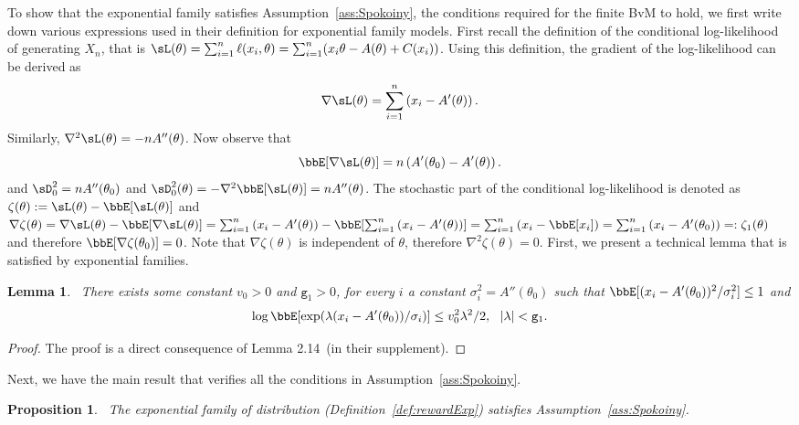 \documentclass[11pt]{article}
\newtheorem{lemma}[theorem]{Lemma}
\newtheorem{proposition}[theorem]{Proposition}
\begin{document}
To show that the exponential family satisfies Assumption~\ref{ass:Spokoiny}, the conditions required for the finite BvM to hold, we first write down various expressions used in their definition for exponential family models.
First recall the definition of the conditional log-likelihood of generating $X_n$, that is $\sL(\theta) = \sum_{i=1}^{n} \ell(x_i,\theta)= \sum_{i=1}^{n} (x_i\theta-A(\theta)+C(x_i))$.
Using this definition, the gradient of the log-likelihood can be derived as
\begin{align}
    \nabla \sL(\theta) = \sum_{i=1}^{n} \left({x_i    -  A'(  \theta) }\right).
\end{align}
Similarly, $\nabla^2 \sL(\theta) = -n A''(  \theta)$. Now observe that \[\bbE[\nabla \sL(\theta)] =  n\left(A'(  \theta_0)-A'(  \theta)\right).\]
and $\sD_0^{2}= n A''(\theta_0)$ and $\sD_0^{2}(\theta)
     = 
    - \nabla^{2} \bbE[ \sL(\theta)]  = n A''(\theta) $.
The stochastic part of the conditional log-likelihood is denoted as $\zeta (\theta):= \sL(\theta) - \bbE[\sL(\theta)]$ and $\nabla \zeta (\theta) = \nabla \sL(\theta) - \bbE[\nabla \sL(\theta)]= \sum_{i=1}^{n} \left({x_i    -  A'(\theta) }\right) - \bbE[ \sum_{i=1}^{n} \left({x_i    -  A'(  \theta) }\right)] = \sum_{i=1}^{n} \left(x_i  - \bbE[x_i]\right) = \sum_{i=1}^{n} \left(x_i  - A'(\theta_0)\right)=: \zeta_1 (\theta)$ and therefore $\bbE[\nabla \zeta(\theta_0)]=0$. Note that $\nabla \zeta(\theta)$ is independent of $\theta$, therefore $\nabla^2 \zeta(\theta)=0$. %
First, we present a technical lemma that is satisfied by exponential families.
\begin{lemma}~\label{lem:Aux1}
        There exists some constant $v_0>0$ and $\mathtt{g}_1>0$, for every $i$ a constant  $\sigma_i^2=A''( \theta_0)$  such that $\bbE[(x_i - A'(\theta_0))^2/\sigma_i^2]\leq 1$ and 
        \begin{align}
            \log \bbE [ \exp(\lambda (x_i - A'(\theta_0))/\sigma_i) ] \leq v_0^2 \lambda^2/2 , ~~|\lambda| < \mathtt{g}_1.
        \end{align}
    \end{lemma}
    \begin{proof}
        The proof is a direct consequence of Lemma 2.14~\cite{Spokoiny2012}(in their supplement).
    \end{proof}
Next, we have the main result that verifies all the conditions in Assumption~\ref{ass:Spokoiny}.
\begin{proposition}~\label{prop:SpokExp}
    The exponential family of distribution (Definition~\ref{def:rewardExp}) satisfies Assumption~\ref{ass:Spokoiny}.
\end{proposition}
\end{document}
